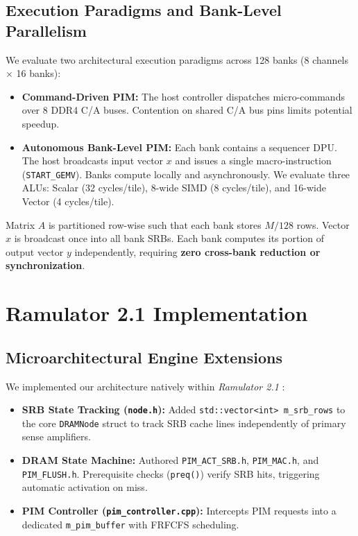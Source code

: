 \documentclass[10pt,twocolumn]{article}
\begin{document}
\subsection{Execution Paradigms and Bank-Level Parallelism}
We evaluate two architectural execution paradigms across 128 banks (8 channels $\times$ 16 banks):
\begin{itemize}
    \item \textbf{Command-Driven PIM:} The host controller dispatches micro-commands over 8 DDR4 C/A buses. Contention on shared C/A bus pins limits potential speedup.
    \item \textbf{Autonomous Bank-Level PIM:} Each bank contains a sequencer DPU. The host broadcasts input vector $x$ and issues a single macro-instruction (\texttt{START\_GEMV}). Banks compute locally and asynchronously. We evaluate three ALUs: Scalar (32 cycles/tile), 8-wide SIMD (8 cycles/tile), and 16-wide Vector (4 cycles/tile).
\end{itemize}
Matrix $A$ is partitioned row-wise such that each bank stores $M/128$ rows. Vector $x$ is broadcast once into all bank SRBs. Each bank computes its portion of output vector $y$ independently, requiring \textbf{zero cross-bank reduction or synchronization}.

\section{Ramulator 2.1 Implementation}
\label{sec:impl}

\subsection{Microarchitectural Engine Extensions}
We implemented our architecture natively within \textit{Ramulator 2.1} \cite{kim2016ramulator}:
\begin{itemize}
    \item \textbf{SRB State Tracking (\texttt{node.h}):} Added \texttt{std::vector<int> m\_srb\_rows} to the core \texttt{DRAMNode} struct to track SRB cache lines independently of primary sense amplifiers.
    \item \textbf{DRAM State Machine:} Authored \texttt{PIM\_ACT\_SRB.h}, \texttt{PIM\_MAC.h}, and \texttt{PIM\_FLUSH.h}. Prerequisite checks (\texttt{preq()}) verify SRB hits, triggering automatic activation on miss.
    \item \textbf{PIM Controller (\texttt{pim_controller.cpp}):} Intercepts PIM requests into a dedicated \texttt{m\_pim_buffer} with FRFCFS scheduling.
\end{itemize}
\end{document}
